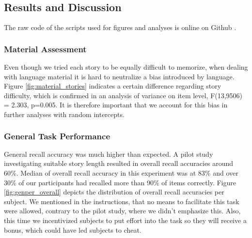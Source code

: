 \documentclass[a4paper,man,natbib,floatsintext,import]{apa6}
\begin{document}
\subsection{Results and Discussion}
The raw code of the scripts used for figures and analyses is online on Github \citep{Oesch2016}.

\subsubsection{Material Assessment}
Even though we tried each story to be equally difficult to memorize, when dealing with language material it is hard to neutralize a bias introduced by language. Figure \ref{fig:material_stories} indicates a certain difference regarding story difficulty, which is confirmed in an analysis of variance on item level, F(13,9506) = 2.303, p=0.005. It is therefore important that we account for this bias in further analyses with random intercepts.

\subsubsection{General Task Performance}
General recall accuracy was much higher than expected. A pilot study investigating suitable story length resulted in overall recall accuracies around 60\%. Median of overall recall accuracy in this experiment was at 83\% and over 30\% of our participants had recalled more than 90\% of items correctly. Figure \ref{fig:genper_overall} depicts the distribution of overall recall accuracies per subject. We mentioned in the instructions, that no means to facilitate this task were allowed, contrary to the pilot study, where we didn't emphasize this. Also, this time we incentivized subjects to put effort into the task so they will receive a bonus, which could have led subjects to cheat.
\end{document}
